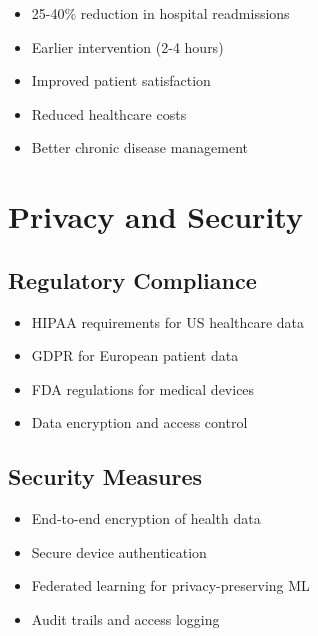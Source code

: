\documentclass[12pt,a4paper]{article}
\begin{document}
\begin{tcolorbox}[colback=medblue!10, colframe=medblue, title=RPM Benefits]
\begin{itemize}
    \item 25-40\% reduction in hospital readmissions
    \item Earlier intervention (2-4 hours)
    \item Improved patient satisfaction
    \item Reduced healthcare costs
    \item Better chronic disease management
\end{itemize}
\end{tcolorbox}

\section{Privacy and Security}

\subsection{Regulatory Compliance}

\begin{itemize}
    \item HIPAA requirements for US healthcare data
    \item GDPR for European patient data
    \item FDA regulations for medical devices
    \item Data encryption and access control
\end{itemize}

\subsection{Security Measures}

\begin{itemize}
    \item End-to-end encryption of health data
    \item Secure device authentication
    \item Federated learning for privacy-preserving ML
    \item Audit trails and access logging
\end{itemize}

\end{document}
